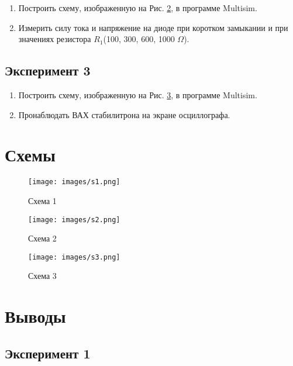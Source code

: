 \documentclass[12pt]{article}
\begin{document}
    \begin{enumerate}
        \item Построить схему, изображенную на Рис. \ref{fig:s:2}, в программе Multisim.
        \item Измерить силу тока и напряжение на диоде при коротком замыкании и при значениях резистора $R_1$(100, 300, 600, 1000 $\Omega$).
    \end{enumerate}

    \subsection*{Эксперимент 3}

    \begin{enumerate}
        \item Построить схему, изображенную на Рис. \ref{fig:s:3}, в программе Multisim.
        \item Пронаблюдать ВАХ стабилитрона на экране осциллографа.
    \end{enumerate}

    \newpage

    \section*{Схемы}

    \begin{figure}[ht]
        \centering
        \texttt{[image: images/s1.png]}
        \caption{Схема 1}
        \label{fig:s:1}
    \end{figure}

    \begin{figure}[ht]
        \centering
        \texttt{[image: images/s2.png]}
        \caption{Схема 2}
        \label{fig:s:2}
    \end{figure}

    \begin{figure}[ht]
        \centering
        \texttt{[image: images/s3.png]}
        \caption{Схема 3}
        \label{fig:s:3}
    \end{figure}

    \newpage

    \section*{Выводы}

    \subsection*{Эксперимент 1}
\end{document}
